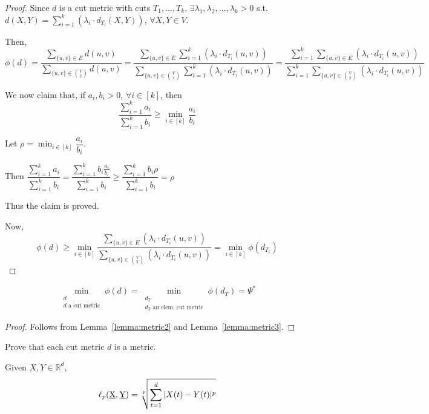     \begin{proof}
        Since $d$ is a cut metric with cuts $T_1, \dots, T_k$, $\exists \lambda_1, \lambda_2, \dots, \lambda_k > 0$ s.t. $d(X,Y) = \sum_{i=1}^k(\lambda_i \cdot d_{T_i}(X,Y))$, $\forall X,Y \in V$.

        Then,
        $\phi(d) =
        \dfrac{\sum_{\{u,v\} \in E} d(u,v)}{\sum_{\{u,v\} \in \binom{V}{2}} d(u,v)} = 
        \dfrac{\sum_{\{u,v\} \in E} \sum_{i=1}^{k} (\lambda_i \cdot d_{T_i}(u,v))}{\sum_{\{u,v\} \in \binom{V}{2}} \sum_{i=1}^{k} (\lambda_i \cdot d_{T_i}(u,v))} = 
        \dfrac{\sum_{i=1}^{k} \sum_{\{u,v\} \in E} (\lambda_i \cdot d_{T_i}(u,v))}{\sum_{i=1}^{k} \sum_{\{u,v\} \in \binom{V}{2}} (\lambda_i \cdot d_{T_i}(u,v))}$

        We now claim that, if $a_i, b_i > 0$, $\forall i \in [k]$, then
        \[ \dfrac{\sum_{i=1}^k a_i}{\sum_{i=1}^k b_i} \geq \min_{i \in [k]} \dfrac{a_i}{b_i} \]

        Let $\rho = \min_{i \in [k]} \dfrac{a_i}{b_i}$.

        Then
        $\dfrac{\sum_{i=1}^k a_i}{\sum_{i=1}^k b_i} = 
        \dfrac{\sum_{i=1}^k b_i \frac{a_i}{b_i}}{\sum_{i=1}^k b_i} \geq
        \dfrac{\sum_{i=1}^k b_i \rho}{\sum_{i=1}^k b_i} =
        \rho$

        Thus the claim is proved.

        Now,
        \[ \phi(d) \geq \min_{i \in [k]} \dfrac{\sum_{\{u,v\} \in E} (\lambda_i \cdot d_{T_i}(u,v))}{\sum_{\{u,v\} \in \binom{V}{2}} (\lambda_i \cdot d_{T_i}(u,v))} = \min_{i \in [k]} \phi(d_{T_i}) \]
    \end{proof}

    \begin{corollary}
        \[ \min_{\substack{d\\ d \text{  a cut metric}}} \phi(d) = \min_{\substack{d_T\\ d_T \text{ an elem. cut metric}}} \phi(d_T) = \Psi^*  \]
    \end{corollary}

    \begin{proof}
        Follows from Lemma~\ref{lemma:metric2} and Lemma~\ref{lemma:metric3}.
    \end{proof}

    \begin{exercise}
        Prove that each cut metric $d$ is a metric.
    \end{exercise}

    \begin{definition}
        Given $\underbar{X}, \underbar{Y} \in \mathbb{R}^d$,
        \[ \ell_p(\underbar{X}, \underbar{Y}) = \sqrt[p]{\sum_{t=1}^{d} \vert X(t) - Y(t) \vert^p} \]
    \end{definition}

